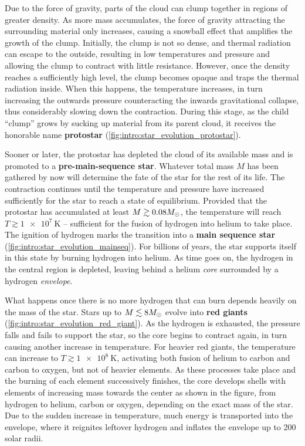 Due to the force of gravity, parts of the cloud can clump together in regions of greater density.
As more mass accumulates, the force of gravity attracting the surrounding material only increases, causing a snowball effect that amplifies the growth of the clump.
Initially, the clump is not so dense, and thermal radiation can escape to the outside, resulting in low temperatures and pressure and allowing the clump to contract with little resistance.
However, once the density reaches a sufficiently high level, the clump becomes opaque and traps the thermal radiation inside.
When this happens, the temperature increases, in turn increasing the outwards pressure counteracting the inwards gravitational collapse, thus considerably slowing down the contraction.
During this stage, as the child ``clump'' grows by sucking up material from its parent cloud, it receives the honorable name \textbf{protostar} (\cref{fig:intro:star_evolution_protostar}).

Sooner or later, the protostar has depleted the cloud of its available mass and is promoted to a \textbf{pre-main-sequence star}.
Whatever total mass $M$ has been gathered by now will determine the fate of the star for the rest of its life.
The contraction continues until the temperature and pressure have increased sufficiently for the star to reach a state of equilibrium.
Provided that the protostar has accumulated at least $M \gtrsim 0.08 M_\odot$, the temperature will reach $T \gtrsim \SI{1e7}{\kelvin}$ -- sufficient for the fusion of hydrogen into helium to take place.
The ignition of hydrogen marks the transition into a \textbf{main sequence star} (\cref{fig:intro:star_evolution_mainseq}).
For billions of years, the star supports itself in this state by burning hydrogen into helium.
As time goes on, the hydrogen in the central region is depleted, leaving behind a helium \emph{core} surrounded by a hydrogen \emph{envelope}.

What happens once there is no more hydrogen that can burn depends heavily on the mass of the star.
Stars up to $M \lesssim 8 M_\odot$ evolve into \textbf{red giants} (\cref{fig:intro:star_evolution_red_giant}).
As the hydrogen is exhausted, the pressure falls and fails to support the star, so the core begins to contract again, in turn causing another increase in temperature.
For heavier red giants, the temperature can increase to $T \gtrsim \SI{1e8}{\kelvin}$, activating both fusion of helium to carbon and carbon to oxygen, but not of heavier elements.
As these processes take place and the burning of each element successively finishes, the core develops shells with elements of increasing mass towards the center as shown in the figure, from hydrogen to helium, carbon or oxygen, depending on the exact mass of the star.
Due to the sudden increase in temperature, much energy is transported into the envelope, where it reignites leftover hydrogen and inflates the envelope up to 200 solar radii.

